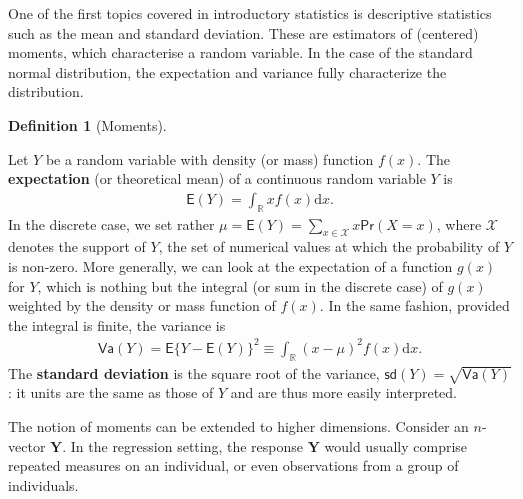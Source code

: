 \documentclass[
  11pt,
  letterpaper,
]{scrbook}
\theoremstyle{definition}
\newtheorem{definition}{Definition}[chapter]
\theoremstyle{definition}
\theoremstyle{plain}
\theoremstyle{remark}
\begin{document}
One of the first topics covered in introductory statistics is
descriptive statistics such as the mean and standard deviation. These
are estimators of (centered) moments, which characterise a random
variable. In the case of the standard normal distribution, the
expectation and variance fully characterize the distribution.

\begin{definition}[Moments]\protect\hypertarget{def-moments}{}\label{def-moments}

Let \(Y\) be a random variable with density (or mass) function \(f(x).\)
The \textbf{expectation} (or theoretical mean) of a continuous random
variable \(Y\) is \begin{align*}
\mathsf{E}(Y)=\int_{\mathbb{R}} x f(x) \mathrm{d} x.
\end{align*} In the discrete case, we set rather
\(\mu = \mathsf{E}(Y)=\sum_{x \in \mathcal{X}} x \mathsf{Pr}(X=x)\),
where \(\mathcal{X}\) denotes the support of \(Y\), the set of numerical
values at which the probability of \(Y\) is non-zero. More generally, we
can look at the expectation of a function \(g(x)\) for \(Y\), which is
nothing but the integral (or sum in the discrete case) of \(g(x)\)
weighted by the density or mass function of \(f(x).\) In the same
fashion, provided the integral is finite, the variance is \begin{align*}
\mathsf{Va}(Y)=\mathsf{E}\{Y-\mathsf{E}(Y)\}^2 \equiv \int_{\mathbb{R}} (x-\mu)^2 f(x) \mathrm{d} x.
\end{align*} The \textbf{standard deviation} is the square root of the
variance, \(\mathsf{sd}(Y)=\sqrt{\mathsf{Va}(Y)}\): it units are the
same as those of \(Y\) and are thus more easily interpreted.

The notion of moments can be extended to higher dimensions. Consider an
\(n\)-vector \(\boldsymbol{Y}.\) In the regression setting, the response
\(\boldsymbol{Y}\) would usually comprise repeated measures on an
individual, or even observations from a group of individuals.


\end{definition}
\end{document}
